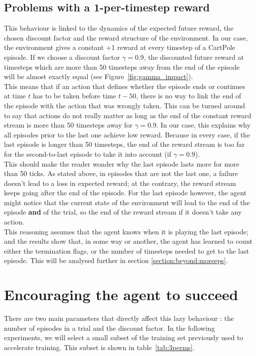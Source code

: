 \subsection{Problems with a 1-per-timestep reward}
\label{section:problems_1_timestep_reward}
This behaviour is linked to the dynamics of the expected future reward, 
the chosen discount factor and the reward structure of the environment.
In our case, the environment gives a constant +1 reward at every timestep of
a CartPole episode. If we choose a discount factor $\gamma=0.9$, the
discounted future reward at timesteps which are more than 50 timesteps away
from the end of the episode will be almost exactly equal (see 
Figure~\ref{fig:gamma_impact}).\\

This means that if an action that defines whether the episode ends or continues
at time $t$ has to be taken before time $t-50$, there is no way to link the
end of the episode with the action that was wrongly taken. This can be turned
around to say that actions do not really matter as long as the end of the
constant reward stream is more than 50 timesteps away for $\gamma=0.9$. In
our case, this explains why all episodes prior to the last one achieve low
reward. Because in every case, if the last episode is longer than 50
timesteps, the end of the reward stream is too far for the second-to-last 
episode to take it into account (if $\gamma=0.9$).\\

This should make the reader wonder why the last episode lasts more for more
than 50 ticks. As stated above, in episodes that are not the last one, a
failure doesn't lead to a loss in expected reward; at the contrary, the reward
stream keeps going after the end of the episode. For the last episode however,
the agent might notice that the current state of the environment will lead
to the end of the episode \textbf{and} of the trial, so the end of the 
reward stream if it doesn't take any action.\\

This reasoning assumes that the agent knows when it is playing the last episode;
and the results show that, in some way or another, the agent has learned to
count either the termination flags, or the number of timesteps needed
to get to the last episode. This will be analysed further in section 
\ref{section:beyond:moreeps}.

\section{Encouraging the agent to succeed}
There are two main parameters that directly affect this lazy behaviour : the
number of episodes in a trial and the discount factor. In the following
experiments, we will select a small subset of the training set previously 
used to accelerate training. This subset is shown in table~\ref{tab:3perms}.

